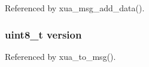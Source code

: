 Referenced by xua\+\_\+msg\+\_\+add\+\_\+data().

\subsubsection[{version}]{\setlength{\rightskip}{0pt plus 5cm}uint8\+\_\+t version}\label{xua__types_8h_ab22abc2906422da61885ac6c8e6a1a59}


Referenced by xua\+\_\+to\+\_\+msg().

